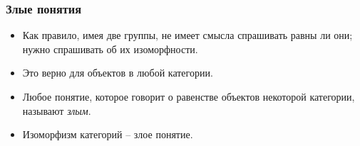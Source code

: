 \documentclass{beamer}
\theoremstyle{definition}
\begin{document}
\begin{frame}
\frametitle{Злые понятия}
\begin{itemize}
\item Как правило, имея две группы, не имеет смысла спрашивать равны ли они; нужно спрашивать об их изоморфности.
\item Это верно для объектов в любой категории.
\item Любое понятие, которое говорит о равенстве объектов некоторой категории, называют \emph{злым}.
\item Изоморфизм категорий -- злое понятие.
\end{itemize}
\end{frame}
\end{document}
